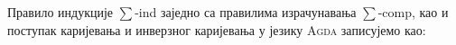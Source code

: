 Правило индукције $\sum$-ind заједно са правилима израчунавања $\sum$-comp, као и поступак каријевања и инверзног каријевања у језику \textsc{Agda} записујемо као:
\begin{code}%
\>[0]%
\>[711I]\AgdaSymbol{:}\AgdaSpace{}%
\AgdaSymbol{\{}\AgdaSpace{}%
\AgdaSymbol{:}\AgdaSpace{}%
\AgdaSpace{}%
\AgdaSpace{}%
\AgdaSymbol{\}}\AgdaSpace{}%
\AgdaSymbol{\{}\AgdaSpace{}%
\AgdaSymbol{:}\AgdaSpace{}%
\AgdaSpace{}%
\AgdaSpace{}%
\AgdaSpace{}%
\AgdaSpace{}%
\AgdaSymbol{\}}\AgdaSpace{}%
\AgdaSymbol{\{}\AgdaSpace{}%
\AgdaSymbol{:}\AgdaSpace{}%
\AgdaSpace{}%
\AgdaSpace{}%
\AgdaSpace{}%
\AgdaSpace{}%
\AgdaSpace{}%
\AgdaSymbol{\}}\<%
\\
\>[.][@{}l@{}]\<[711I]%
\>[12]\AgdaSpace{}%
\AgdaSymbol{((}\AgdaSpace{}%
\AgdaSymbol{:}\AgdaSpace{}%
\AgdaSymbol{)}\AgdaSpace{}%
\AgdaSymbol{(}\AgdaSpace{}%
\AgdaSymbol{:}\AgdaSpace{}%
\AgdaSpace{}%
\AgdaSymbol{)}\AgdaSpace{}%
\AgdaSpace{}%
\AgdaSpace{}%
\AgdaSymbol{(}\AgdaSpace{}%
\AgdaOperator{\AgdaInductiveConstructor{,}}\AgdaSpace{}%
\AgdaSymbol{))}\<%
\\
%
\>[12]\AgdaSpace{}%
\AgdaSymbol{(}\AgdaBound{(}\AgdaSpace{}%
\AgdaOperator{\AgdaInductiveConstructor{,}}\AgdaSpace{}%
\AgdaBound{)}\AgdaSpace{}%
\AgdaSymbol{:}\AgdaSpace{}%
\AgdaSpace{}%
\AgdaSymbol{)}\AgdaSpace{}%
\AgdaSpace{}%
\AgdaSpace{}%
\AgdaSymbol{(}\AgdaSpace{}%
\AgdaOperator{\AgdaInductiveConstructor{,}}\AgdaSpace{}%
\AgdaSymbol{)}\<%
\\
\>[0]\AgdaSpace{}%
\AgdaSpace{}%
\AgdaSymbol{(}\AgdaSpace{}%
\AgdaOperator{\AgdaInductiveConstructor{,}}\AgdaSpace{}%
\AgdaSymbol{)}\AgdaSpace{}%
\AgdaSymbol{=}\AgdaSpace{}%
\AgdaSpace{}%
\AgdaSpace{}%
\<%
\\
%
\\[\AgdaEmptyExtraSkip]%
\>[0]%
\>[763I]\AgdaSymbol{:}\AgdaSpace{}%
\AgdaSymbol{\{}\AgdaSpace{}%
\AgdaSymbol{:}\AgdaSpace{}%
\AgdaSpace{}%

\end{code}

